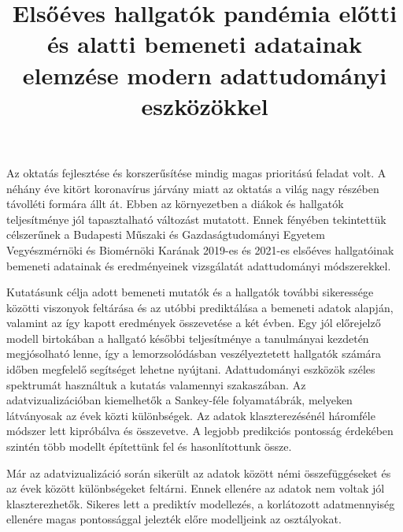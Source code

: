 \documentclass[12pt]{article}
\title{Elsőéves hallgatók pandémia előtti és alatti bemeneti adatainak elemzése modern adattudományi eszközökkel}
\begin{document}
\maketitle



Az oktatás fejlesztése és korszerűsítése mindig magas prioritású feladat volt. A néhány éve kitört koronavírus járvány miatt az oktatás a világ nagy részében távolléti formára állt át. Ebben az környezetben a diákok és hallgatók teljesítménye jól tapasztalható változást mutatott. Ennek fényében tekintettük célszerűnek a Budapesti Műszaki és Gazdaságtudományi Egyetem Vegyészmérnöki és Biomérnöki Karának 2019-es és 2021-es elsőéves hallgatóinak bemeneti adatainak és eredményeinek vizsgálatát adattudományi módszerekkel.

Kutatásunk célja adott bemeneti mutatók és a hallgatók további sikeressége közötti viszonyok feltárása és az utóbbi prediktálása a bemeneti adatok alapján, valamint az így kapott eredmények összevetése a két évben. Egy jól előrejelző modell birtokában a hallgató későbbi teljesítménye a tanulmányai kezdetén megjósolható lenne, így a lemorzsolódásban veszélyeztetett hallgatók számára időben megfelelő segítséget lehetne  nyújtani.
Adattudományi eszközök széles spektrumát használtuk a kutatás valamennyi szakaszában. Az adatvizualizációban kiemelhetők a Sankey-féle folyamatábrák, melyeken látványosak az évek közti különbségek. Az adatok klaszterezésénél háromféle módszer lett kipróbálva és összevetve. A legjobb predikciós pontosság érdekében szintén több modellt építettünk fel és hasonlítottunk össze.

Már az adatvizualizáció során sikerült az adatok között némi összefüggéseket és az évek között különbségeket feltárni. Ennek ellenére az adatok nem voltak jól klaszterezhetők. Sikeres lett a prediktív modellezés, a korlátozott adatmennyiség ellenére magas pontossággal jelezték előre modelljeink az osztályokat.
\end{document}
